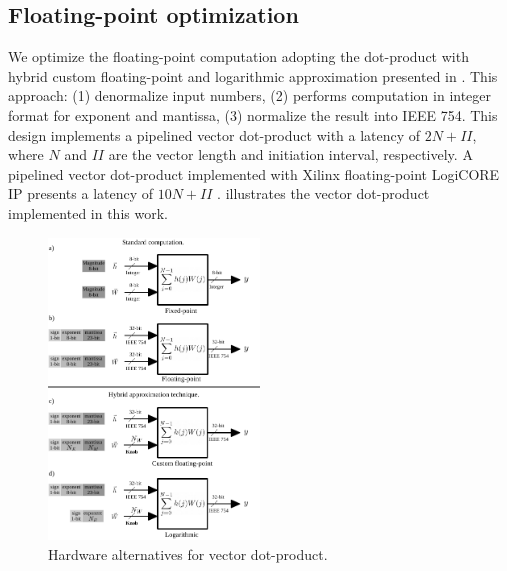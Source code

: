 \subsection{Floating-point optimization}
We optimize the floating-point computation adopting the dot-product with hybrid custom floating-point and logarithmic approximation presented in \cite{nevarez2021accelerating}. This approach: (1) denormalize input numbers, (2) performs computation in integer format for exponent and mantissa, (3) normalize the result into IEEE 754. This design implements a pipelined vector dot-product with a latency of $2N+II$, where $N$ and $II$ are the vector length and initiation interval, respectively. A pipelined vector dot-product implemented with Xilinx floating-point LogiCORE IP presents a latency of $10N+II$ \cite{nevarez2021accelerating}.  illustrates the vector dot-product implemented in this work.

\begin{figure}[t!]
	\centering
	\includegraphics[width=0.5\textwidth]{../figures/dot-product_unit.pdf}
	\caption{Hardware alternatives for vector dot-product.}
	\label{fig:dot_product}
\end{figure}



